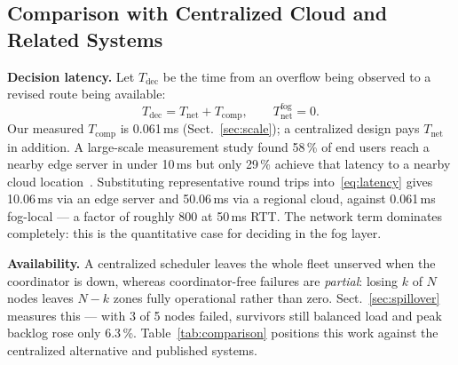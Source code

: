 \documentclass{llncs}
\begin{document}
\subsection{Comparison with Centralized Cloud and Related Systems}
\label{sec:comparison}
\textbf{Decision latency.} Let $T_{\mathrm{dec}}$ be the time from an overflow
being observed to a revised route being available:
\begin{equation}
  T_{\mathrm{dec}} = T_{\mathrm{net}} + T_{\mathrm{comp}},
  \qquad T_{\mathrm{net}}^{\mathrm{fog}} = 0 .
  \label{eq:latency}
\end{equation}
Our measured $T_{\mathrm{comp}}$ is 0.061\,ms (Sect.~\ref{sec:scale}); a
centralized design pays $T_{\mathrm{net}}$ in addition. A large-scale
measurement study found 58\,\% of end users reach a nearby edge server in under
10\,ms but only 29\,\% achieve that latency to a nearby cloud
location~\cite{charyyev}. Substituting representative round trips
into~\eqref{eq:latency} gives 10.06\,ms via an edge server and 50.06\,ms via a
regional cloud, against 0.061\,ms fog-local --- a factor of roughly 800 at
50\,ms RTT. The network term dominates completely: this is the quantitative
case for deciding in the fog layer.

\textbf{Availability.} A centralized scheduler leaves the whole fleet unserved
when the coordinator is down, whereas coordinator-free failures are
\emph{partial}: losing $k$ of $N$ nodes leaves $N-k$ zones fully operational
rather than zero. Sect.~\ref{sec:spillover} measures this --- with 3 of 5 nodes
failed, survivors still balanced load and peak backlog rose only 6.3\,\%.
Table~\ref{tab:comparison} positions this work against the centralized
alternative and published systems.
\end{document}
